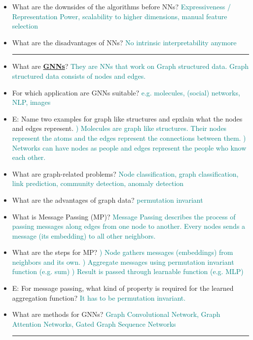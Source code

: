 \documentclass{report}
\newcommand{\asw}[2][teal]{}
\renewcommand{\asw}[2][teal]{\textcolor{#1}{#2}}
\begin{document}
\begin{itemize}
		\item What are the downsides of the algorithms before NNs?
		\asw{\newline Expressiveness / Representation Power, scalability to higher dimensions, manual feature selection}
		\item What are the disadvantages of NNs?
		\asw{\newline No intrinsic interpretability anymore}
		\newline
		\hrule 
		
		\item What are \textbf{\underline{GNNs}}?
		\asw{\newline They are NNs that work on Graph structured data. Graph structured data consists of nodes and edges.}
		\item For which application are GNNs suitable?
		\asw{\newline e.g. molecules, (social) networks, NLP, images}
		\item E: Name two examples for graph like structures and epxlain what the nodes and edges represent.
		\asw{) Molecules are graph like structures. Their nodes represent the atoms and the edges represent the connections between them.
			\newline 2) Networks can have nodes as people and edges represent the people who know each other.}
		\item What are graph-related problems?
		\asw{\newline Node classification, graph classification, link prediction, community detection, anomaly detection}
		\item What are the advantages of graph data?
		\asw{\newline permutation invariant}
		\item What is Message Passing (MP)?
		\asw{\newline Message Passing describes the process of passing messages along edges from one node to another. Every nodes sends a message (its embedding) to all other neighbors.}
		\item What are the steps for MP?
		\asw{) Node gathers messages (embeddings) from neighbors and its own.
			\newline 2) Aggregate messages using permutation invariant function (e.g. sum)
			\newline 3) Result is passed through learnable function (e.g. MLP)}
		\item E: For message passing, what kind of property is required for the learned aggregation function?
		\asw{\newline It has to be permutation invariant.}
		\item What are methods for GNNs?
		\asw{\newline Graph Convolutional Network, Graph Attention Networks, Gated Graph Sequence Networks}
		\newline
		\hrule 
		

\end{itemize}
\end{document}
